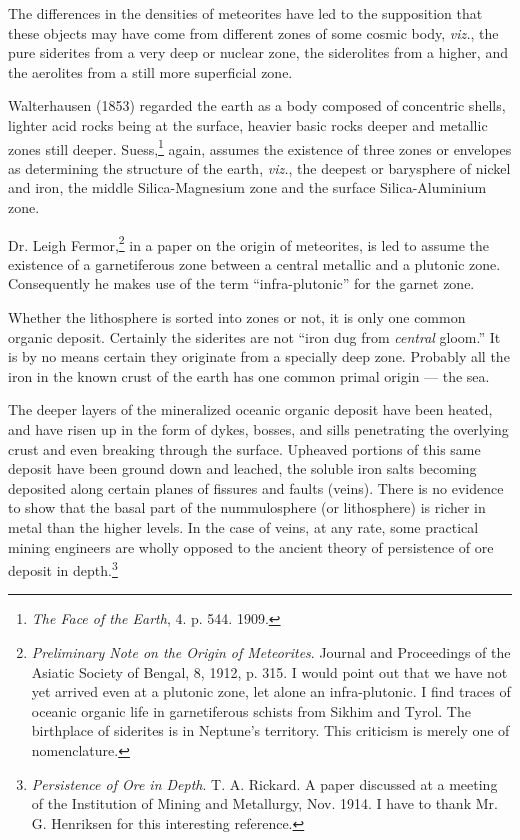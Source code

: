 \documentclass[a4paper, 12pt, oneside]{article}
\begin{document}
The differences in the densities of meteorites have led to the supposition that these objects may have come from different zones of some cosmic body, \emph{viz.}, the pure siderites from a very deep or nuclear zone, the siderolites from a higher, and the aerolites from a still more superficial zone.

Walterhausen (1853) regarded the earth as a body composed of concentric shells, lighter acid rocks being at the surface, heavier basic rocks deeper and metallic zones still deeper. Suess,\footnote{\emph{The Face of the Earth}, 4. p. 544. 1909.} again, assumes the existence of three zones or envelopes as determining the structure of the earth, \emph{viz.}, the deepest or barysphere of nickel and iron, the middle Silica-Magnesium zone and the surface Silica-Aluminium zone.

Dr. Leigh Fermor,\footnote{\emph{Preliminary Note on the Origin of Meteorites}. Journal and Proceedings of the Asiatic Society of Bengal, 8, 1912, p. 315. I would point out that we have not yet arrived even at a plutonic zone, let alone an infra-plutonic. I find traces of oceanic organic life in garnetiferous schists from Sikhim and Tyrol. The birthplace of siderites is in Neptune's territory. This criticism is merely one of nomenclature.} in a paper on the origin of meteorites, is led to assume the existence of a garnetiferous zone between a central metallic and a plutonic zone. Consequently he makes use of the term ``infra-plutonic'' for the garnet zone.

Whether the lithosphere is sorted into zones or not, it is only one common organic deposit. Certainly the siderites are not ``iron dug from \emph{central} gloom.'' It is by no means certain they originate from a specially deep zone. Probably all the iron in the known crust of the earth has one common primal origin --- the sea.

The deeper layers of the mineralized oceanic organic deposit have been heated, and have risen up in the form of dykes, bosses, and sills penetrating the overlying crust and even breaking through the surface. Upheaved portions of this same deposit have been ground down and leached, the soluble iron salts becoming deposited along certain planes of fissures and faults (veins). There is no evidence to show that the basal part of the nummulosphere (or lithosphere) is richer in metal than the higher levels. In the case of veins, at any rate, some practical mining engineers are wholly opposed to the ancient theory of persistence of ore deposit in depth.\footnote{\emph{Persistence of Ore in Depth}. T. A. Rickard. A paper discussed at a meeting of the Institution of Mining and Metallurgy, Nov. 1914. I have to thank Mr. G. Henriksen for this interesting reference.}
\end{document}
